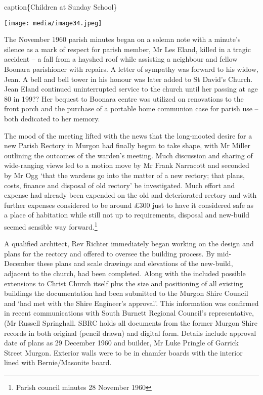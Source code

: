 caption\{Children at Sunday School\}

\texttt{[image: media/image34.jpeg]}

The November 1960 parish minutes began on a solemn note with a minute's silence as a mark of respect for parish member, Mr Les Eland, killed in a tragic accident -- a fall from a hayshed roof while assisting a neighbour and fellow Boonara parishioner with repairs. A letter of sympathy was forward to his widow, Jean. A bell and bell tower in his honour was later added to St David's Church. Jean Eland continued uninterrupted service to the church until her passing at age 80 in 199?? Her bequest to Boonara centre was utilized on renovations to the front porch and the purchase of a portable home communion case for parish use -- both dedicated to her memory.

The mood of the meeting lifted with the news that the long-mooted desire for a new Parish Rectory in Murgon had finally begun to take shape, with Mr Miller outlining the outcomes of the warden's meeting. Much discussion and sharing of wide-ranging views led to a motion move by Mr Frank Narracott and seconded by Mr Ogg `that the wardens go into the matter of a new rectory; that plans, costs, finance and disposal of old rectory' be investigated. Much effort and expense had already been expended on the old and deteriorated rectory and with further expenses considered to be around £300 just to have it considered safe as a place of habitation while still not up to requirements, disposal and new-build seemed sensible way forward.\footnote{Parish council minutes 28 November 1960}

A qualified architect, Rev Richter immediately began working on the design and plans for the rectory and offered to oversee the building process. By mid-December these plans and scale drawings and elevations of the new-build, adjacent to the church, had been completed. Along with the included possible extensions to Christ Church itself plus the size and positioning of all existing buildings the documentation had been submitted to the Murgon Shire Council and `had met with the Shire Engineer's approval'. This information was confirmed in recent communications with South Burnett Regional Council's representative, (Mr Russell Springhall. SBRC holds all documents from the former Murgon Shire records in both original (pencil drawn) and digital form. Details include approval date of plans as 29 December 1960 and builder, Mr Luke Pringle of Garrick Street Murgon. Exterior walls were to be in chamfer boards with the interior lined with Bernie/Masonite board.


